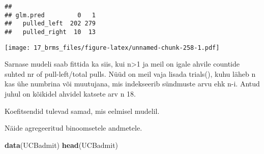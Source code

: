 \documentclass[]{article}
\newenvironment{Shaded}{\begin{snugshade}}{\end{snugshade}}
\newcommand{\KeywordTok}[1]{\textcolor[rgb]{0.13,0.29,0.53}{\textbf{#1}}}
\newcommand{\DataTypeTok}[1]{\textcolor[rgb]{0.13,0.29,0.53}{#1}}
\newcommand{\DecValTok}[1]{\textcolor[rgb]{0.00,0.00,0.81}{#1}}
\newcommand{\FloatTok}[1]{\textcolor[rgb]{0.00,0.00,0.81}{#1}}
\newcommand{\StringTok}[1]{\textcolor[rgb]{0.31,0.60,0.02}{#1}}
\newcommand{\OtherTok}[1]{\textcolor[rgb]{0.56,0.35,0.01}{#1}}
\newcommand{\OperatorTok}[1]{\textcolor[rgb]{0.81,0.36,0.00}{\textbf{#1}}}
\newcommand{\NormalTok}[1]{#1}
\begin{document}
\begin{verbatim}
##               
## glm.pred         0   1
##   pulled_left  202 279
##   pulled_right  10  13
\end{verbatim}

\begin{Shaded}
\end{Shaded}

\texttt{[image: 17\_brms\_files/figure-latex/unnamed-chunk-258-1.pdf]}

Sarnase mudeli saab fittida ka siis, kui n\textgreater{}1 ja meil on
igale ahvile countide suhted nr of pull-left/total pulls. Nüüd on meil
vaja lisada trials(), kuhu läheb n kas ühe numbrina või muutujana, mis
indekseerib sündmuste arvu ehk n-i. Antud juhul on kõikidel ahvidel
katsete arv n 18.

\begin{Shaded}
\end{Shaded}

Koefitsendid tulevad samad, mis eelmisel mudelil.

Näide agregeeritud binoomsetele andmetele.

\begin{Shaded}
\begin{Highlighting}[]
\KeywordTok{data}\NormalTok{(UCBadmit)}
\KeywordTok{head}\NormalTok{(UCBadmit)}
\end{Highlighting}
\end{Shaded}
\end{document}
